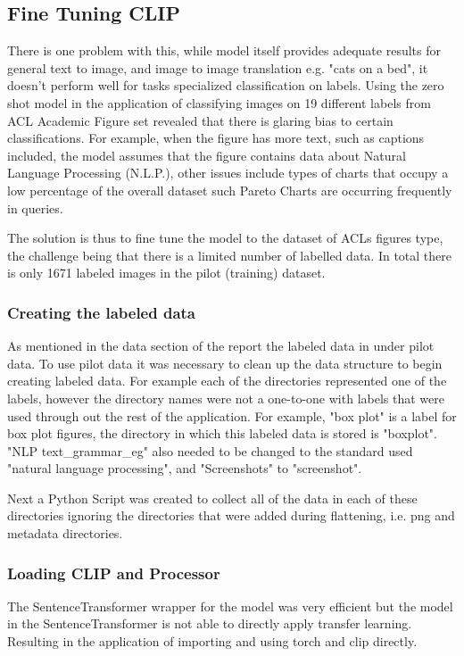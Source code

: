 \documentclass[article, 10pt]{article}
\begin{document}
\subsection{Fine Tuning CLIP}
There is one problem with this, while model itself provides adequate results for general text to image, and image to image translation e.g. "cats on a bed", it doesn't perform well for tasks specialized classification on labels.
Using the zero shot model in the application of classifying images on 19 different labels from ACL Academic Figure set revealed that there is glaring bias to certain classifications. For example, when the figure has more text, such as captions included, the model assumes that the figure contains data about Natural Language Processing (N.L.P.), other issues include types of charts that occupy
a low percentage of the overall dataset such Pareto Charts are occurring frequently in queries. 

The solution is thus to fine tune the model to the dataset of ACLs figures type, the
challenge being that there is a limited number of labelled data. In total there is only
1671 labeled images in the pilot (training) dataset. 

\subsubsection{Creating the labeled data}
As mentioned in the data section of the report the labeled data in under pilot data. To use pilot data it was necessary to clean up the data structure to begin creating labeled data. For example each of the directories represented one of the labels, however the directory names were not a one-to-one with labels that were used through out the rest of the application. For example, "box plot" is a label for box plot figures, the directory in which this labeled data is stored is "boxplot". "NLP text\_grammar\_eg" also needed to be changed to the standard used "natural language processing", and "Screenshots" to "screenshot".

Next a Python Script was created to collect all of the data in each of these directories ignoring the directories that were added during flattening, i.e. png and metadata directories. 



\subsubsection{Loading CLIP and Processor}
The SentenceTransformer wrapper for the model was very efficient but the model in the
SentenceTransformer is not able to directly apply transfer learning. Resulting in the 
application of importing and using torch and clip directly. 
\end{document}
